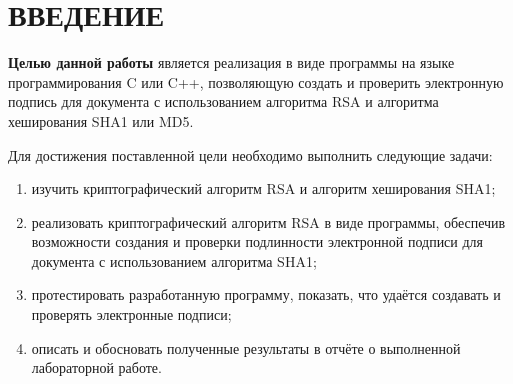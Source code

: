 \chapter*{ВВЕДЕНИЕ}

\textbf{Целью данной работы} является реализация в виде программы на языке программирования C или C++, позволяющую создать и проверить электронную подпись для документа с использованием алгоритма RSA и алгоритма хеширования SHA1 или MD5.

Для достижения поставленной цели необходимо выполнить следующие задачи:
\begin{enumerate}
	\item изучить криптографический алгоритм RSA и алгоритм хеширования SHA1;
	\item реализовать криптографический алгоритм RSA в виде программы, обеспечив возможности создания и проверки подлинности электронной подписи для документа с использованием алгоритма SHA1;
	\item протестировать разработанную программу, показать, что удаётся создавать и проверять электронные подписи;
	\item описать и обосновать полученные результаты в отчёте о выполненной лабораторной работе.
\end{enumerate}
